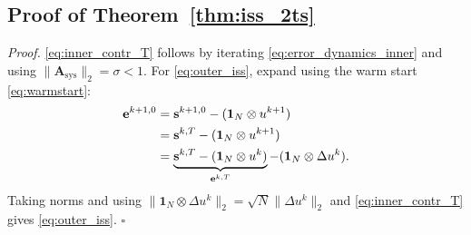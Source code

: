 \documentclass[letterpaper, 10 pt, conference]{ieeeconf} %
\newenvironment{proof}[1][Proof]{\par\noindent\textit{#1. }\ignorespaces}
  {\hfill$\square$\par}
\begin{document}
\subsection{Proof of Theorem~\ref{thm:iss_2ts}}
\begin{proof}
\eqref{eq:inner_contr_T} follows by iterating \eqref{eq:error_dynamics_inner} and using $\|\mathbf{A}_{\mathrm{sys}}\|_2=\sigma<1$. For \eqref{eq:outer_iss}, expand using the warm start \eqref{eq:warmstart}:
\begin{align}
\mathbf{e}^{k+1,0}
&= \mathbf{s}^{k+1,0} - (\mathbf{1}_N\otimes u^{k+1}) \notag\\
&= \mathbf{s}^{k,T}   - (\mathbf{1}_N\otimes u^{k+1}) \notag\\
&= \underbrace{\mathbf{s}^{k,T}-(\mathbf{1}_N\otimes u^k)}_{\mathbf{e}^{k,T}}
   -(\mathbf{1}_N\otimes\Delta u^k).
\end{align}
Taking norms and using $\|\mathbf{1}_N\otimes\Delta u^k\|_2=\sqrt{N}\|\Delta u^k\|_2$ and \eqref{eq:inner_contr_T} gives \eqref{eq:outer_iss}.
\end{proof}
\end{document}
